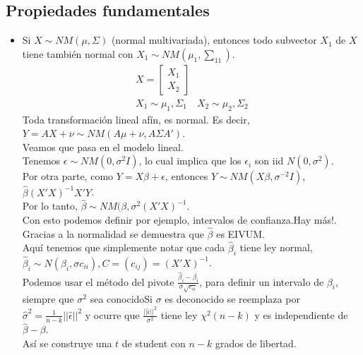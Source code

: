 \documentclass[10pt]{article}
\theoremstyle{plain}
\theoremstyle{definition}
\begin{document}
\subsection{Propiedades fundamentales}
\begin{itemize}
\item Si $X \sim NM(\mu, \Sigma)$ (normal multivariada), entonces todo subvector $X_{1}$ de $X$ tiene también normal con $X_{1} \sim NM(\mu_{1},\sum_{11})$.\\
\begin{align*}
X= \begin{bmatrix}
X_{1}\\ X_{2}
\end{bmatrix}\\
X_{1}\sim \mu_{1},\Sigma_{1}\quad X_{2}\sim \mu_{2},\Sigma_{2}
\end{align*}
Toda transformación lineal afín, es normal. Es decir, $Y=AX+\nu \sim NM(A\mu + \nu, A\Sigma A')$.\\

Veamos que pasa en el modelo lineal.\\
Tenemos $\epsilon \sim NM(0, \sigma^2I)$, lo cual implica que los $\epsilon_{i}$ son iid $N(0,\sigma^2)$.\\
Por otra parte, como $Y = X\beta + \epsilon$, entonces $Y \sim NM(X\beta, \sigma^{-2}I)$, $\hat{\beta} (X'X)^{-1}X'Y$.\\

Por lo tanto, $\hat{\beta} \sim NM(\beta, \sigma^2(X'X)^{-1}$.\\

Con esto podemos definir por ejemplo, intervalos de confianza.Hay más!.\\
Gracias a la normalidad se demuestra que $\hat{\beta}$ es EIVUM.\\

Aquí tenemos que simplemente notar que cada $\hat{\beta}_{i}$ tiene ley normal, $\hat{\beta}_{i} \sim N(\beta_{i}, \sigma c_{ii}), C = (c_{ij}) = (X'X)^{-1}$.\\

Podemos usar el método del pivote $\frac{\hat{\beta}_{i} - \beta_{i}}{\sigma\sqrt{c_{ii}}}$, para definir un intervalo de $\beta_{i}$, siempre que $\sigma^2$ sea conocidoSi $\sigma$ es deconocido se reemplaza por $\hat{\sigma}^2 = \frac{1}{n-k} ||\hat{\epsilon}||^2$ y ocurre que $\frac{||\hat{\epsilon}||^2}{\sigma^2}$ tiene ley $\chi^2 (n-k)$ y es independiente de $\hat{\beta} - \beta$.\\

Así se construye una $t$ de student con $n-k$ grados de libertad.
\end{itemize}
\end{document}
